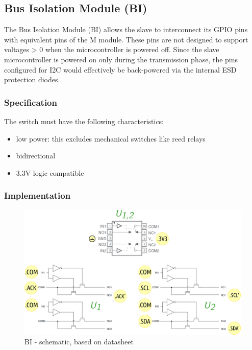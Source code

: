 \subsection{Bus Isolation Module (BI)}

The Bus Isolation Module (BI) allows the slave to interconnect its GPIO pins with equivalent pins of the \mu M module.
These pins are not designed to support voltages > 0 when the microcontroller is powered off.
Since the slave microcontroller
is powered on only during the transmission phase, the pins configured for I2C would effectively be back-powered via
the internal ESD protection diodes.

\subsubsection*{Specification}

The switch must have the following characteristics:
\begin{itemize}
    \item low power: this excludes mechanical switches like reed relays
    \item bidirectional
    \item 3.3V logic compatible
\end{itemize}

\subsubsection*{Implementation}



\clearpage


\begin{figure}[h]
    \centering
    \includegraphics[width=1.0\textwidth]{MA/BI/BI}
    \caption{BI - schematic, based on datasheet \cite{noauthor_ts5a23157_2004}}
\end{figure}


\clearpage


